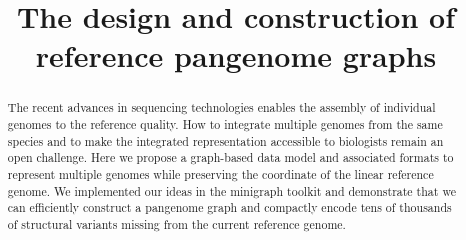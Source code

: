\documentclass[twocolumn]{bmcart}
\begin{document}
\begin{frontmatter}

\begin{fmbox}

\title{The design and construction of reference pangenome graphs}

\author[
   addressref={aff1,aff2},          %
   corref={aff1,aff2},              %
   email={hli@ds.dfci.harvard.edu}  %
]{ }
\author[
   addressref={aff1,aff2},
]{ }
\author[
   addressref={aff2},
]{ }

\address[id=aff1]{%
  , %
  ,                    %
}
\address[id=aff2]{%
  ,
  ,
}

\begin{abstractbox}

\begin{abstract} %
The recent advances in sequencing technologies enables the assembly of
individual genomes to the reference quality. How to integrate multiple genomes
from the same species and to make the integrated representation accessible to
biologists remain an open challenge. Here we propose a graph-based data model
and associated formats to represent multiple genomes while preserving the
coordinate of the linear reference genome. We implemented our ideas in the
minigraph toolkit and demonstrate that we can efficiently construct a pangenome
graph and compactly encode tens of thousands of structural variants missing
from the current reference genome.
\end{abstract}

\begin{keyword}
\end{keyword}

\end{abstractbox}

\end{fmbox}

\end{frontmatter}
\end{document}
